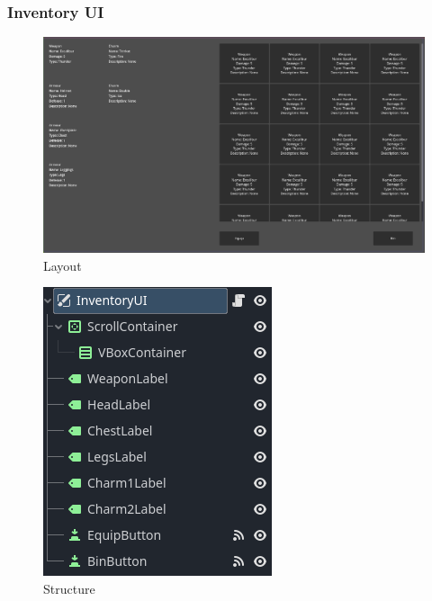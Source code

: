 \documentclass{article}
\begin{document}
        \subsubsection{Inventory UI}
        \begin{multicols}{2}
                \begin{figure}[H]
                        \centering
                        \includegraphics[width = 0.8\columnwidth]{images/development/InventoryUI_layout.PNG}
                        \caption{Layout}
                \end{figure}
                \begin{figure}[H]
                        \centering
                        \includegraphics[width = 0.8\columnwidth]{images/development/InventoryUI_structure.PNG}
                        \caption{Structure}
                \end{figure}   
        \end{multicols}
\end{document}
